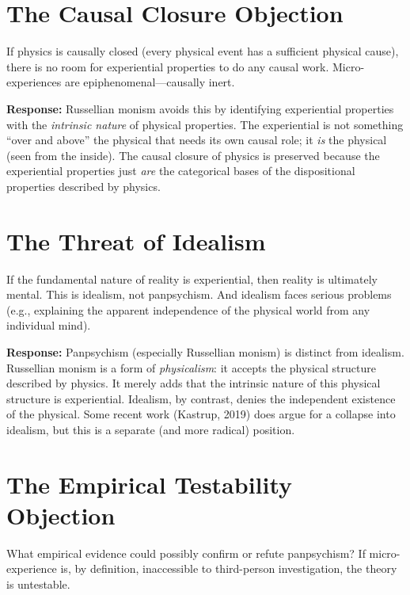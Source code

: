 \documentclass[11pt,a4paper]{report}
\begin{document}
\section{The Causal Closure Objection}

\begin{objbox}
If physics is causally closed (every physical event has a sufficient physical cause), there is no room for experiential properties to do any causal work. Micro-experiences are epiphenomenal---causally inert.
\end{objbox}

\textbf{Response:} Russellian monism avoids this by identifying experiential properties with the \emph{intrinsic nature} of physical properties. The experiential is not something ``over and above'' the physical that needs its own causal role; it \emph{is} the physical (seen from the inside). The causal closure of physics is preserved because the experiential properties just \emph{are} the categorical bases of the dispositional properties described by physics.

\section{The Threat of Idealism}

\begin{objbox}
If the fundamental nature of reality is experiential, then reality is ultimately mental. This is idealism, not panpsychism. And idealism faces serious problems (e.g., explaining the apparent independence of the physical world from any individual mind).
\end{objbox}

\textbf{Response:} Panpsychism (especially Russellian monism) is distinct from idealism. Russellian monism is a form of \emph{physicalism}: it accepts the physical structure described by physics. It merely adds that the intrinsic nature of this physical structure is experiential. Idealism, by contrast, denies the independent existence of the physical. Some recent work (Kastrup, 2019) does argue for a collapse into idealism, but this is a separate (and more radical) position.

\section{The Empirical Testability Objection}

\begin{objbox}
What empirical evidence could possibly confirm or refute panpsychism? If micro-experience is, by definition, inaccessible to third-person investigation, the theory is untestable.
\end{objbox}
\end{document}
